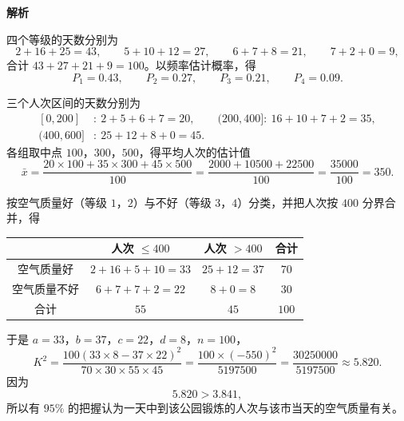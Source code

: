 \begin{answer}
\textbf{解析}


四个等级的天数分别为
\nopagebreak[4]
\[2+16+25=43,\qquad 5+10+12=27,\qquad 6+7+8=21,\qquad 7+2+0=9,\]
合计 $43+27+21+9=100$。以频率估计概率，得
\nopagebreak[4]
\[P_1=0.43,\qquad P_2=0.27,\qquad P_3=0.21,\qquad P_4=0.09 .\]


三个人次区间的天数分别为
\nopagebreak[4]
\[\begin{aligned}
[0,200]&:\ 2+5+6+7=20,\qquad (200,400]:\ 16+10+7+2=35,\\
(400,600]&:\ 25+12+8+0=45 .
\end{aligned}\]
各组取中点 $100$，$300$，$500$，得平均人次的估计值
\nopagebreak[4]
\[\bar x=\frac{20\times100+35\times300+45\times500}{100}=\frac{2000+10500+22500}{100}=\frac{35000}{100}=350 .\]


按空气质量好（等级 $1$，$2$）与不好（等级 $3$，$4$）分类，并把人次按 $400$ 分界合并，得

\begin{center}
\begin{tabular}{cccc}
\toprule
 & 人次 $\leqslant400$ & 人次 $>400$ & 合计 \\
\midrule
空气质量好 & $2+16+5+10=33$ & $25+12=37$ & $70$ \\
空气质量不好 & $6+7+7+2=22$ & $8+0=8$ & $30$ \\
合计 & $55$ & $45$ & $100$ \\
\bottomrule
\end{tabular}
\end{center}

于是 $a=33$，$b=37$，$c=22$，$d=8$，$n=100$，
\nopagebreak[4]
\[K^2=\frac{100(33\times8-37\times22)^2}{70\times30\times55\times45}=\frac{100\times(-550)^2}{5197500}=\frac{30250000}{5197500}\approx5.820 .\]
因为
\nopagebreak[4]
\[5.820>3.841,\]
所以有 $95\%$ 的把握认为一天中到该公园锻炼的人次与该市当天的空气质量有关。




\end{answer}
